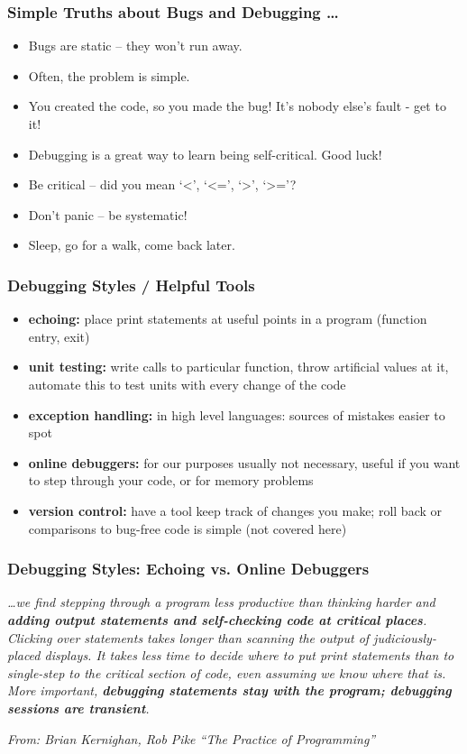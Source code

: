 \documentclass[unknownkeysallowed]{beamer}
\begin{document}
\begin{frame}
	\frametitle{Simple Truths about Bugs and Debugging \dots}
	\begin{itemize}
		\item Bugs are static -- they won't run away.
		\item Often, the problem is simple.
		\item You created the code, so you made the bug! It's nobody else's fault - get to it!
		\item Debugging is a great way to learn being self-critical. Good luck!
		\item Be critical -- did you mean `<', `<=', `>', `>='?
		\item Don't panic -- be systematic!
		\item Sleep, go for a walk, come back later.
	\end{itemize}
\end{frame}

\begin{frame}
	\frametitle{Debugging Styles / Helpful Tools}

	\begin{itemize}
		\item {\bf echoing:} place print statements at useful points in a program (function entry, exit)
		\item {\bf unit testing:} write calls to particular function, throw artificial values at it, automate this to test units with every change of the code
		\item {\bf exception handling:} in high level languages: sources of mistakes easier to spot
		\item {\bf online debuggers:} for our purposes usually not necessary, useful if you want to step through your code, or for memory problems
		\item {\bf version control:} have a tool keep track of changes you make; roll back or comparisons to bug-free code is simple (not covered here)
	\end{itemize}
\end{frame}
	

\begin{frame}
	\frametitle{Debugging Styles: Echoing vs. Online Debuggers}
	\begin{block}{}
	\emph{\dots we find stepping through a program less productive than
		thinking harder and {\bf adding output statements and
		self-checking code at critical places}. Clicking over
		statements takes longer than scanning the output of
		judiciously-placed displays. It takes less time to decide where
		to put print statements than to single-step to the critical
		section of code, even assuming we know where that is. More
		important, {\bf debugging statements stay with the program;
		debugging sessions are transient}.}
	\begin{flushleft}
	\tiny{\emph{From: Brian Kernighan, Rob Pike ``The Practice of Programming''}}
	\end{flushleft}	
	\end{block}
\end{frame}
\end{document}
